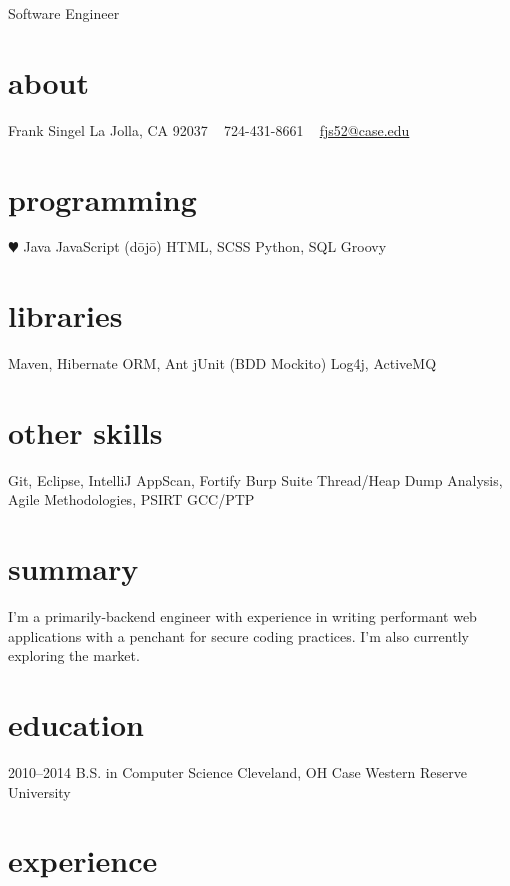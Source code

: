 \documentclass[]{friggeri-cv}
\begin{document}
       {Software Engineer}


\begin{aside}
  \section{about}
    Frank Singel
    La Jolla, CA
    92037
    ~
    724-431-8661
    ~
    \href{mailto:fjs52@case.edu}{fjs52@case.edu}
  \section{programming}
    {\color{red} $\varheartsuit$} Java
    JavaScript
    (d\={o}j\={o})
    HTML, SCSS
    Python, SQL
    Groovy
  \section{libraries}
    Maven, 
    Hibernate ORM, Ant
    jUnit (BDD Mockito)
    Log4j, ActiveMQ
  \section{other skills}
    Git, Eclipse, IntelliJ
    AppScan, Fortify
    Burp Suite
    Thread/Heap Dump Analysis,
    Agile Methodologies, PSIRT
    GCC/PTP
    
\end{aside}

\section{summary}
I'm a primarily-backend engineer with experience in writing performant web applications with a penchant for secure coding practices. I'm also currently exploring the market.

\section{education}

\begin{entrylist}
  \entry
    {2010–2014}
    {B.S. in Computer Science}
    {Cleveland, OH}
    {Case Western Reserve University}
\end{entrylist}

\section{experience}
\end{document}
